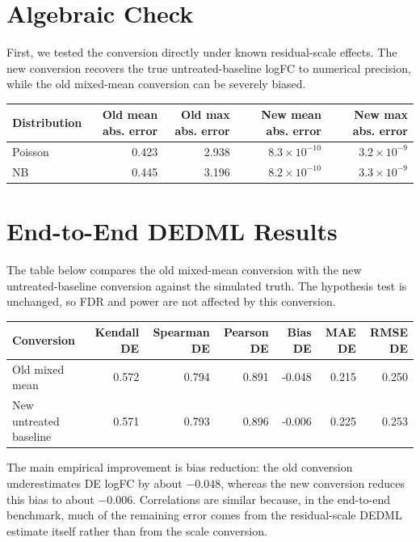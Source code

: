 \documentclass[11pt]{article}
\begin{document}
\section*{Algebraic Check}

First, we tested the conversion directly under known residual-scale effects.
The new conversion recovers the true untreated-baseline logFC to numerical
precision, while the old mixed-mean conversion can be severely biased.

\begin{center}
\begin{tabular}{lrrrr}
\toprule
Distribution & Old mean abs. error & Old max abs. error & New mean abs. error & New max abs. error \\
\midrule
Poisson & 0.423 & 2.938 & \(8.3\times10^{-10}\) & \(3.2\times10^{-9}\) \\
NB      & 0.445 & 3.196 & \(8.2\times10^{-10}\) & \(3.3\times10^{-9}\) \\
\bottomrule
\end{tabular}
\end{center}

\section*{End-to-End DEDML Results}

The table below compares the old mixed-mean conversion with the new
untreated-baseline conversion against the simulated truth. The hypothesis test
is unchanged, so FDR and power are not affected by this conversion.

\begin{center}
\begin{tabular}{lrrrrrr}
\toprule
Conversion & Kendall DE & Spearman DE & Pearson DE & Bias DE & MAE DE & RMSE DE \\
\midrule
Old mixed mean & 0.572 & 0.794 & 0.891 & -0.048 & 0.215 & 0.250 \\
New untreated baseline & 0.571 & 0.793 & 0.896 & -0.006 & 0.225 & 0.253 \\
\bottomrule
\end{tabular}
\end{center}

The main empirical improvement is bias reduction: the old conversion
underestimates DE logFC by about \(-0.048\), whereas the new conversion reduces
this bias to about \(-0.006\). Correlations are similar because, in the
end-to-end benchmark, much of the remaining error comes from the residual-scale
DEDML estimate itself rather than from the scale conversion.
\end{document}

